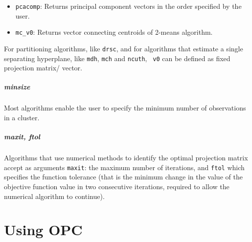 \documentclass{book}
\begin{document}
\begin{itemize}

\item {\tt pcacomp}: Returns principal component vectors in the order specified by the user.

\item {\tt mc\_v0}: Returns vector connecting centroids of 2-means algorithm.
\end{itemize}

\noindent
For partitioning algorithms, like {\tt drsc}, and for algorithms that estimate
a single separating hyperplane, like {\tt mdh}, {\tt mch} and {\tt ncuth}, {\tt
v0} can be defined as fixed projection matrix/ vector.

\paragraph{minsize}
%
Most algorithms enable the user to specify the minimum number of observations in a cluster.


\paragraph{maxit, ftol}
%
Algorithms that use numerical methods to identify the optimal projection matrix
accept as arguments {\tt maxit}: the maximum number of iterations,
and {\tt ftol} which specifies the function tolerance (that is
the minimum change in the value of the objective function
value in two consecutive iterations, required to allow the numerical
algorithm to continue).

%
%
%
%



\chapter{Using OPC}\label{sec:using}
\end{document}
